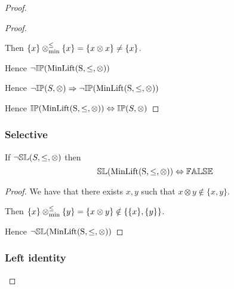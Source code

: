 \documentclass[../Summary.tex]{subfiles}
\begin{document}
\begin{proof}
\begin{proof}
\begin{ind}
\vspace{0.5em}

Then $\{x\} \mathbin{\otimes_{\min}^{\leq}} \{x\} = \{x \otimes x\} \neq \{ x \}$.

\vspace{0.5em}

Hence $\neg {\mathbb{IP}}(\mathrm{MinLift(S,\leq,\otimes)})$
\end{ind}
Hence $\neg {\mathbb{IP}}(S,\otimes) \Rightarrow \neg {\mathbb{IP}}(\mathrm{MinLift(S,\leq,\otimes)})$

\vspace{2em}

Hence ${\mathbb{IP}}(\mathrm{MinLift(S,\leq,\otimes)}) \Leftrightarrow {\mathbb{IP}}(S,\otimes)$
\end{proof}






\subsubsection{Selective}

\begin{theorem} \label{thm:minlift_sl}
If $\neg{\mathbb{SL}}(S,\leq,\otimes)$ then
\begin{equation*}
{\mathbb{SL}}(\mathrm{MinLift(S,\leq,\otimes)}) \Leftrightarrow {\mathbb{FALSE}}
\end{equation*}
\end{theorem}

\begin{proof}

\vspace{0.5em}

We have that there exists $x, y$ such that $x \otimes y \notin \{x , y\}$.

\vspace{0.5em}

Then $\{ x \} \mathbin{\otimes_{\min}^{\leq}} \{ y \} = \{ x \otimes y \} \notin \{ \{ x \}, \{ y \}\}$.

\vspace{0.5em}

Hence $\neg {\mathbb{SL}}(\mathrm{MinLift(S,\leq,\otimes)})$
\end{proof}





\subsubsection{Left identity}


\end{proof}
\end{document}
